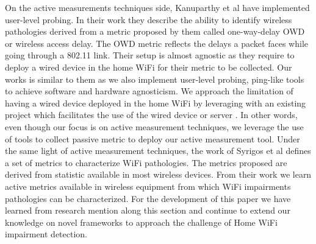 On the active measurements techniques side, Kanuparthy et al \cite{can_user_level_probing} have implemented user-level probing. In their work they describe the ability to identify wireless pathologies derived from a metric proposed by them called one-way-delay OWD or wireless access delay. The OWD metric reflects the delays a packet faces while going through a 802.11 link. Their setup is almost agnostic as they require to deploy a wired device in the home WiFi for their metric to be collected. Our works is similar to them as we also implement user-level probing, ping-like tools to achieve software and hardware agnosticism. We approach the limitation of having a wired device deployed in the home WiFi by leveraging with an existing project which facilitates the use of the wired device or server \cite{hostview}. In other words, even though our focus is on active measurement techniques, we leverage the use of tools to collect passive metric to deploy our active measurement tool. Under the same light of active measurement techniques, the work of Syrigos et al \cite{WLAN_Troubleshooting} defines a set of metrics to characterize WiFi pathologies. The metrics proposed are derived from statistic available in most wireless devices. From their work we learn active metrics available in wireless equipment from which WiFi impairments pathologies can be characterized.
For the development of this paper we have learned from research mention along this section and continue to extend our knowledge on novel frameworks to approach the challenge of Home WiFi impairment detection.

\newpage

